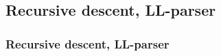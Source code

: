 \subsection{Recursive descent, LL-parser}
\begin{frame}
  \frametitle{Recursive descent, LL-parser}


\end{frame}
